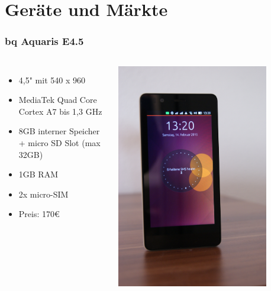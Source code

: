 \documentclass{beamer}
\begin{document}
\section{Geräte und Märkte}

\frame{\sectionpage}

\begin{frame}
  \frametitle{bq Aquaris E4.5}
  \begin{columns}
      \begin{itemize}
        \item 4,5" mit 540 x 960
        \item MediaTek Quad Core Cortex A7 bis 1,3 GHz
        \item 8GB interner Speicher + micro SD Slot (max 32GB)
        \item 1GB RAM
        \item 2x micro-SIM
        \item Preis: 170€
      \end{itemize}
      \includegraphics[width=0.8\textwidth]{images/ubuntuphone}
  \end{columns}
\end{frame}
\end{document}
